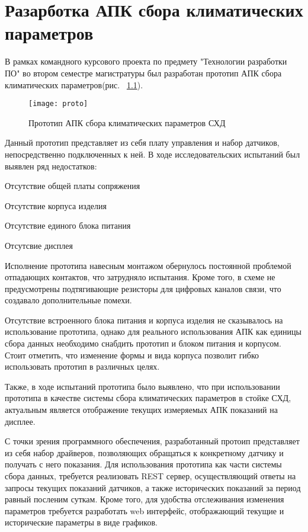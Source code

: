 \chapter{Разарботка АПК сбора климатических параметров}
В рамках командного курсового проекта по предмету "Технологии разработки ПО" во втором семестре магистратуры был разработан прототип АПК сбора климатических параметров(рис. ~\ref{fig:proto}).

\begin{figure}[H]
	\centering
	\texttt{[image: proto]}
	\caption{Прототип АПК сбора климатических параметров СХД}
	\label{fig:proto}
\end{figure}
Данный прототип представляет из себя плату управления и набор датчиков, непосредственно подключенных к ней. В ходе исследовательских испытаний был выявлен ряд недостатков: 
\begin{itemize*}
	\item{Отсутствие общей платы сопряжения}
	\item{Отсутствие корпуса изделия}
	\item{Отсутствие единого блока питания}
	\item{Отсутсвие дисплея}
\end{itemize*}

Исполнение прототипа навесным монтажом обернулось постоянной проблемой отпадающих контактов, что затрудняло испытания. Кроме того, в схеме не предусмотрены подтягивающие резисторы для цифровых каналов связи, что создавало дополнительные помехи. 

Отсутствие встроенного блока питания и корпуса изделия не сказывалось на использование прототипа, однако для реального использования АПК как единицы сбора данных необходимо снабдить прототип и блоком питания и корпусом. Стоит отметить, что изменение формы и вида корпуса позволит гибко использовать прототип в различных целях.

Также, в ходе испытаний прототипа было выявлено, что при использовании прототипа в качестве системы сбора климатических параметров в стойке СХД, актуальным является отображение текущих измеряемых АПК показаний на дисплее. 

С точки зрения программного обеспечения, разработанный протоип представляет из себя набор драйверов, позволяющих обращаться к конкретному датчику и получать с него показания. Для использования прототипа как части системы сбора данных, требуется реализовать REST сервер, осуществляющий ответы на запросы текущих показаний датчиков, а также исторических показаний за период равный посленим суткам. Кроме того, для удобства отслеживания изменения параметров требуется разработать web интерфейс, отображающий текущие и исторические параметры в виде графиков.

